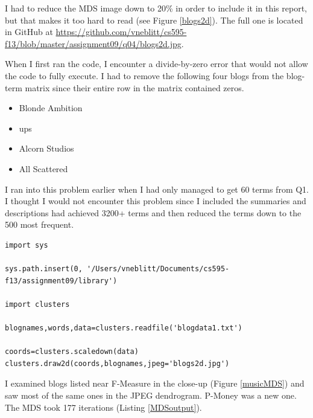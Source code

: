 \documentclass{article}
\begin{document}
I had to reduce the MDS image down to 20\% in order to include it in this report, but that makes it too hard to read (see Figure \ref{blogs2d}). The full one is located in GitHub at \url{https://github.com/vneblitt/cs595-f13/blob/master/assignment09/q04/blogs2d.jpg}.

When I first ran the code, I encounter a divide-by-zero error that would not allow the code to fully execute. I had to remove the following four blogs from the blog-term matrix since their entire row in the matrix contained zeros.

\begin{itemize}
\item Blonde Ambition
\item ups
\item Alcorn Studios
\item All Scattered
\end{itemize}

I ran into this problem earlier when I had only managed to get 60 terms from Q1. I thought I would not encounter this problem since I included the summaries and descriptions had achieved 3200+ terms and then reduced the terms down to the 500 most frequent.

\begin{lstlisting}[frame=single, caption=getMDS.py, label=getMDS]
import sys

sys.path.insert(0, '/Users/vneblitt/Documents/cs595-f13/assignment09/library')

import clusters

blognames,words,data=clusters.readfile('blogdata1.txt')

coords=clusters.scaledown(data)
clusters.draw2d(coords,blognames,jpeg='blogs2d.jpg')
\end{lstlisting}

I examined blogs listed near F-Measure in the close-up (Figure \ref{musicMDS}) and saw most of the same ones in the JPEG dendrogram. P-Money was a new one. The MDS took 177 iterations (Listing \ref{MDSoutput}).
\end{document}
